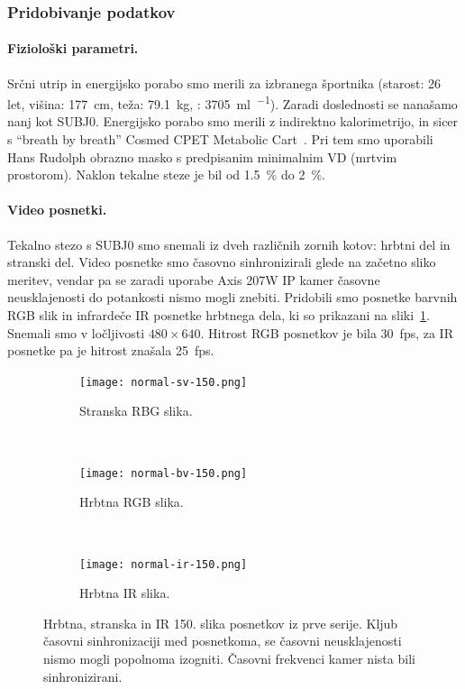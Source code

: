 \subsubsection{Pridobivanje podatkov}
\paragraph{Fiziolo\v{s}ki parametri.}
Srčni utrip in energijsko porabo smo merili za izbranega športnika (starost: 26 let, višina: \SI{177}{\cm}, teža: \SI{79.1}{\kg}, \vomax: \SI{3705}{\ml\per\min}). Zaradi doslednosti se nanašamo nanj kot SUBJ0. Energijsko porabo smo merili z indirektno kalorimetrijo, in sicer s ``breath by breath'' Cosmed CPET Metabolic Cart~\cite{beaver1973line}. Pri tem smo uporabili Hans Rudolph obrazno masko s predpisanim minimalnim VD (mrtvim prostorom). Naklon tekalne steze je bil od \SI{1.5}{\%} do \SI{2}{\%}.

\paragraph{Video posnetki.}
Tekalno stezo s SUBJ0 smo snemali iz dveh različnih zornih kotov: hrbtni del in stranski del. Video posnetke smo časovno sinhronizirali glede na začetno sliko meritev, vendar pa se zaradi uporabe Axis 207W IP kamer časovne neusklajenosti do potankosti nismo mogli znebiti. Pridobili smo posnetke barvnih RGB slik in infrardeče IR posnetke hrbtnega dela, ki so prikazani na sliki~\ref{fig:primer-posnetka-rgb-ir}. Snemali smo v ločljivosti $480 \times 640$. Hitrost RGB posnetkov je bila \SI{30}{fps}, za IR posnetke pa je hitrost znašala \SI{25}{fps}.  

\begin{figure}[htb]
	\centering
	\begin{subfigure}[t]{0.3\columnwidth}
		\centering
		\texttt{[image: normal-sv-150.png]}
		\caption{Stranska RBG slika.}
	\end{subfigure}
	~
	\begin{subfigure}[t]{0.3\columnwidth}
		\centering
		\texttt{[image: normal-bv-150.png]}
		\caption{Hrbtna RGB slika.}
	\end{subfigure}
	~
    \begin{subfigure}[t]{0.3\columnwidth}
    	\centering
		\texttt{[image: normal-ir-150.png]}
		\caption{Hrbtna IR slika.}
	\end{subfigure}
	\caption[Hrbtna, stranska in IR 150. slika posnetkov iz prve serije]{Hrbtna, stranska in IR 150. slika posnetkov iz prve serije. Kljub časovni sinhronizaciji med posnetkoma, se časovni neusklajenosti nismo mogli popolnoma izogniti. Časovni frekvenci kamer nista bili sinhronizirani.}
	\label{fig:primer-posnetka-rgb-ir}
\end{figure}


